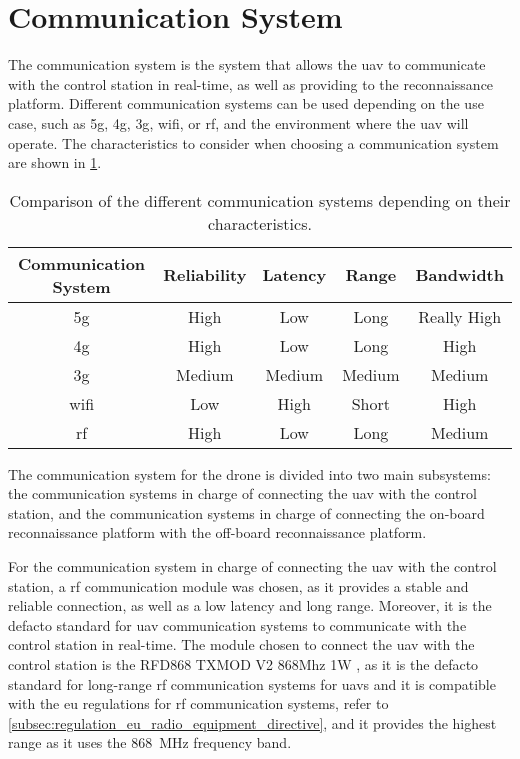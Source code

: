 \section{Communication System}\label{sec:design_communication_system}

The communication system is the system that allows the \gls{uav} to communicate with the control station in real-time, as well as providing to the reconnaissance platform. Different communication systems can be used depending on the use case, such as \gls{5g}, \gls{4g}, \gls{3g}, \gls{wifi}, or \gls{rf}, and the environment where the \gls{uav} will operate. The characteristics to consider when choosing a communication system are shown in \cref{tab:communication_system_characteristics}.

\begin{table}
  \begin{tabular}{ c c c c c }
    \toprule
    \textbf{Communication System} & \textbf{Reliability} & \textbf{Latency} & \textbf{Range} & \textbf{Bandwidth} \\
    \midrule
    \gls{5g} & High & Low & Long & Really High \\
    \gls{4g} & High & Low & Long & High \\
    \gls{3g} & Medium & Medium & Medium & Medium \\
    \gls{wifi} & Low & High & Short & High \\
    \gls{rf} & High & Low & Long & Medium \\
    \bottomrule
  \end{tabular}
  \caption{Comparison of the different communication systems depending on their characteristics.}\label{tab:communication_system_characteristics}
\end{table}

The communication system for the drone is divided into two main subsystems: the communication systems in charge of connecting the \gls{uav} with the control station, and the communication systems in charge of connecting the on-board reconnaissance platform with the off-board reconnaissance platform.

For the communication system in charge of connecting the \gls{uav} with the control station, a \gls{rf} communication module was chosen, as it provides a stable and reliable connection, as well as a low latency and long range. Moreover, it is the defacto standard for \gls{uav} communication systems to communicate with the control station in real-time. The module chosen to connect the \gls{uav} with the control station is the RFD868 TXMOD V2 868Mhz 1W \autocite{rcinnovationsComprarMdulos}, as it is the defacto standard for long-range \gls{rf} communication systems for \glspl{uav} and it is compatible with the \gls{eu} regulations for \gls{rf} communication systems, refer to \cref{subsec:regulation_eu_radio_equipment_directive}, and it provides the highest range as it uses the \SI{868}{\mega\hertz} frequency band.

